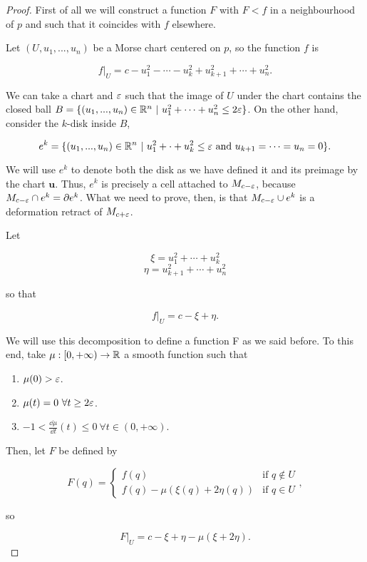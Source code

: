 \begin{proof}
First of all we will construct a function $F$ with $F < f$ in a neighbourhood of $p$ and such that it coincides with $f$ elsewhere.

Let $(U,u_1,...,u_n)$ be a Morse chart centered on $p$, so the function $f$ is

$$\left. f \right|_U = c - u_1^2 - \cdots - u_k^2 + u_{k+1}^2 + \cdots + u_n^2 .$$

We can take a chart and $\varepsilon$ such that the image of $U$ under the chart contains the closed ball $B = \{(u_1,...,u_n) \in \mathbb{R}^n \ | \ u_1^2 + \cdots + u_n^2 \leq 2\varepsilon\}$. On the other hand, consider the $k$-disk inside $B$,

$$e^k = \{ (u_1,...,u_n) \in \R^n \ | \ u_1^2 + \cdot + u_k^2 \leq \e \text{ and } u_{k+1} = \cdots = u_n = 0 \} .$$

We will use $e^k$ to denote both the disk as we have defined it and its preimage by the chart $\mathbf{u}$. Thus, $e^k$ is precisely a cell attached to $M_{c-\varepsilon}$, because $M_{c-\varepsilon} \cap e^k = \partial e^k$. What we need to prove, then, is that $M_{c-\varepsilon} \cup e^k$ is a deformation retract of $M_{c+\varepsilon}$.

Let

$$\xi = u_1^2 + \cdots + u_k^2$$
$$\eta = u_{k+1}^2 + \cdots + u_n^2$$

so that

$$\left. f \right|_U = c - \xi + \eta .$$

We will use this decomposition to define a function F as we said before. To this end, take $\mu : [0,+\infty) \rightarrow \mathbb{R}$ a smooth function such that

\begin{enumerate}
	\item $\mu(0) > \varepsilon$.
	\item $\mu(t) = 0 \ \forall t \geq 2\varepsilon$.
	\item $-1 < \frac{\dd \mu}{\dd t}(t) \leq 0 \ \forall t \in (0,+\infty)$.
\end{enumerate}

Then, let $F$ be defined by

$$F(q) = \left\{ \begin{array}{ll} f(q) & \text{if } q \notin U \\ f(q) - \mu(\xi(q) + 2\eta(q)) & \text{if } q \in U \end{array} \right. ,$$

so

$$\left. F \right|_U = c - \xi + \eta - \mu(\xi + 2\eta) .$$


\end{proof}
